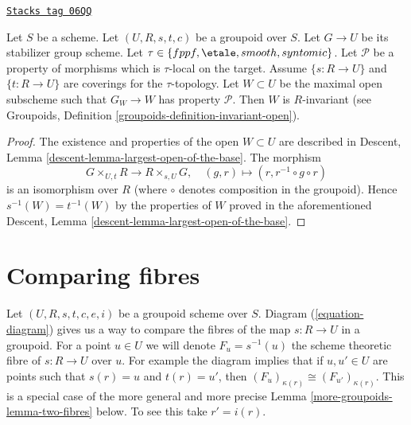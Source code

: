 \begin{lemma}
\label{more-groupoids-lemma-property-G-invariant}
\href{https://stacks.math.columbia.edu/tag/06QQ}{\texttt{Stacks tag 06QQ}}

Let $S$ be a scheme.
Let $(U, R, s, t, c)$ be a groupoid over $S$.
Let $G \to U$ be its stabilizer group scheme.
Let $\tau \in \{fppf, \linebreak[0] \etale, \linebreak[0]
smooth, \linebreak[0] syntomic\}$.
Let $\mathcal{P}$ be a property of morphisms which is $\tau$-local
on the target. Assume $\{s : R \to U\}$ and $\{t : R \to U\}$ are coverings
for the $\tau$-topology. Let $W \subset U$ be the maximal open subscheme
such that $G_W \to W$ has property $\mathcal{P}$. Then $W$ is $R$-invariant
(see
Groupoids, Definition
\ref{groupoids-definition-invariant-open}).
\end{lemma}

\begin{proof}
The existence and properties of the open $W \subset U$ are described in
Descent, Lemma \ref{descent-lemma-largest-open-of-the-base}.
The morphism
$$
G \times_{U, t} R \longrightarrow R \times_{s, U} G, \quad
(g, r) \longmapsto (r, r^{-1} \circ g \circ r)
$$
is an isomorphism over $R$ (where $\circ$ denotes
composition in the groupoid). Hence $s^{-1}(W) = t^{-1}(W)$ by the
properties of $W$ proved in the aforementioned
Descent, Lemma \ref{descent-lemma-largest-open-of-the-base}.
\end{proof}

\section{Comparing fibres}
\label{more-groupoids-section-fibres}
Let $(U, R, s, t, c, e, i)$ be a groupoid scheme over $S$.
Diagram (\ref{equation-diagram})
gives us a way to compare the fibres of the map $s : R \to U$ in a groupoid.
For a point $u \in U$ we will denote $F_u = s^{-1}(u)$ the scheme
theoretic fibre of $s : R \to U$ over $u$. For example the diagram
implies that if $u, u' \in U$ are points such
that $s(r) = u$ and $t(r) = u'$, then
$(F_u)_{\kappa(r)} \cong (F_{u'})_{\kappa(r)}$.
This is a special case of the more general and more precise
Lemma \ref{more-groupoids-lemma-two-fibres}
below. To see this take $r' = i(r)$.

